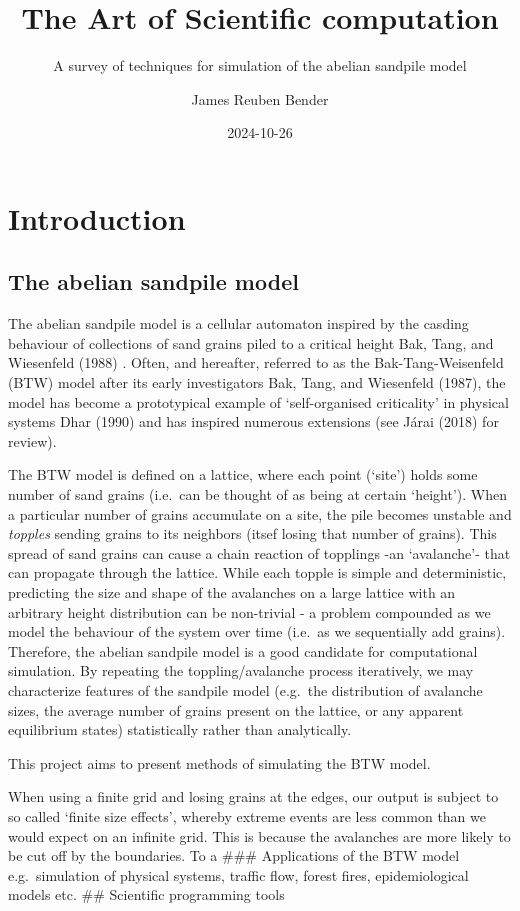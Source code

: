 \documentclass[
  letterpaper,
  DIV=11,
  numbers=noendperiod]{scrartcl}
\title{The Art of Scientific computation}
\subtitle{A survey of techniques for simulation of the abelian sandpile
model}
\author{James Reuben Bender}
\date{2024-10-26}
\begin{document}
\maketitle


\section{Introduction}\label{introduction}

\subsection{The abelian sandpile
model}\label{the-abelian-sandpile-model}

The abelian sandpile model is a cellular automaton inspired by the
casding behaviour of collections of sand grains piled to a critical
height Bak, Tang, and Wiesenfeld (1988) . Often, and hereafter, referred
to as the Bak-Tang-Weisenfeld (BTW) model after its early investigators
Bak, Tang, and Wiesenfeld (1987), the model has become a prototypical
example of `self-organised criticality' in physical systems Dhar (1990)
and has inspired numerous extensions (see Járai (2018) for review).

The BTW model is defined on a lattice, where each point (`site') holds
some number of sand grains (i.e.~can be thought of as being at certain
`height'). When a particular number of grains accumulate on a site, the
pile becomes unstable and \emph{topples} sending grains to its neighbors
(itsef losing that number of grains). This spread of sand grains can
cause a chain reaction of topplings -an `avalanche'- that can propagate
through the lattice. While each topple is simple and deterministic,
predicting the size and shape of the avalanches on a large lattice with
an arbitrary height distribution can be non-trivial - a problem
compounded as we model the behaviour of the system over time (i.e.~as we
sequentially add grains). Therefore, the abelian sandpile model is a
good candidate for computational simulation. By repeating the
toppling/avalanche process iteratively, we may characterize features of
the sandpile model (e.g.~the distribution of avalanche sizes, the
average number of grains present on the lattice, or any apparent
equilibrium states) statistically rather than analytically.

This project aims to present methods of simulating the BTW model.

When using a finite grid and losing grains at the edges, our output is
subject to so called `finite size effects', whereby extreme events are
less common than we would expect on an infinite grid. This is because
the avalanches are more likely to be cut off by the boundaries. To a
\#\#\# Applications of the BTW model e.g.~simulation of physical
systems, traffic flow, forest fires, epidemiological models etc. \#\#
Scientific programming tools
\end{document}
